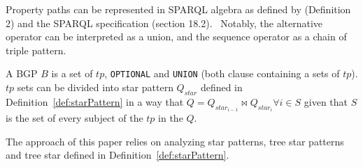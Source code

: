 Property paths can be represented in SPARQL algebra as defined by \citeauthor{Kostylev2015} (Definition 2) and the SPARQL specification (section 18.2).~
Notably, the alternative operator can be interpreted as a union, and the sequence operator as a chain of triple pattern.

\begin{definition}[BGP]\label{def:bgp}
 A BGP $B$ is a set of $tp$, \texttt{OPTIONAL} and \texttt{UNION} (both clause containing a sets of $tp$).
 $tp$ sets can be divided into star pattern $Q_{star}$ defined in Definition~\ref{def:starPattern} in a way 
 that $Q = Q_{star_{i-1}} \bowtie Q_{star_i} \forall i \in S$ given that $S$ is the set of every subject of the $tp$ in the $Q$.
\end{definition}
\fi

The approach of this paper relies on analyzing star patterns, tree star patterns and tree star defined in Definition~\ref{def:starPattern}.

